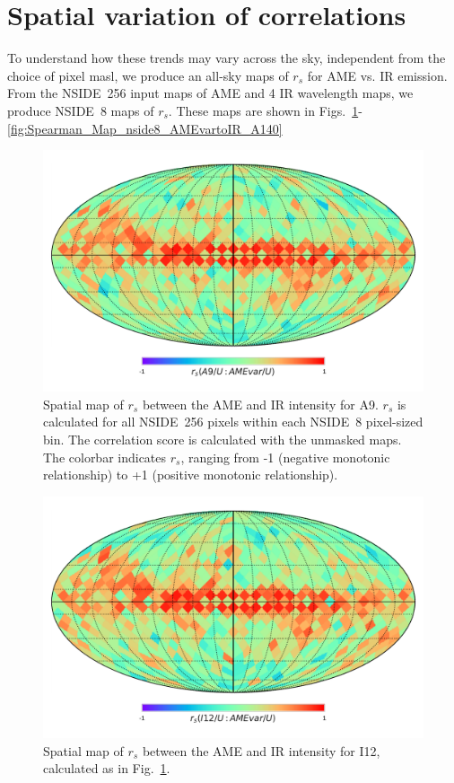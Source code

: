 \section{Spatial variation of correlations}
    To understand how these trends may vary across the sky, independent from the choice of pixel masl, we produce an all-sky maps of $r_{s}$ for AME vs. IR emission. From the NSIDE~256 input maps of AME and 4 IR wavelength maps, we produce NSIDE~8 maps of $r_{s}$. These maps are shown in Figs.~\ref{fig:Spearman_Map_nside8_AMEvartoIR_A9}-\ref{fig:Spearman_Map_nside8_AMEvartoIR_A140}
      \begin{figure}
        \includegraphics[width=\textwidth/2]{../Plots/Allsky_Corr/Spearman_Map_nside8_A9toAMEvar.pdf}
        \centering
        \caption{Spatial map of $r_{s}$ between the AME and IR intensity for A9. $r_{s}$ is calculated for all NSIDE~256 pixels within each NSIDE~8 pixel-sized bin. The correlation score is calculated with the unmasked maps. The colorbar indicates $r_{s}$, ranging from -1 (negative monotonic relationship) to +1 (positive monotonic relationship).}
        \label{fig:Spearman_Map_nside8_AMEvartoIR_A9}
      \end{figure}
      \begin{figure}
        \includegraphics[width=\textwidth/2]{../Plots/Allsky_Corr/Spearman_Map_nside8_I12toAMEvar.pdf}
        \centering
        \caption{Spatial map of $r_{s}$ between the AME and IR intensity for I12, calculated as in Fig.~\ref{fig:Spearman_Map_nside8_AMEvartoIR_A9}.}
        \label{fig:Spearman_Map_nside8_AMEvartoIR_I12}
      \end{figure}
